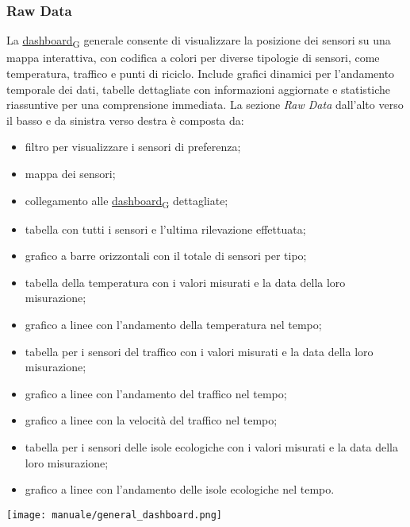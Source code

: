 \subsubsection{Raw Data}
La \href{https://7last.github.io/docs/pb/documentazione-interna/glossario\#dashboard}{dashboard\textsubscript{G}} generale consente di visualizzare la posizione dei sensori su una mappa interattiva, con codifica a colori per diverse tipologie di sensori, come temperatura, traffico e punti di riciclo. Include grafici dinamici per l'andamento temporale dei dati, tabelle dettagliate con informazioni aggiornate e statistiche riassuntive per una comprensione immediata. La sezione \textit{Raw Data} dall'alto verso il basso e da sinistra verso destra è composta da:
\begin{itemize}
    \item filtro per visualizzare i sensori di preferenza;
    \item mappa dei sensori;
    \item collegamento alle \href{https://7last.github.io/docs/pb/documentazione-interna/glossario\#dashboard}{dashboard\textsubscript{G}} dettagliate;
    \item tabella con tutti i sensori e l'ultima rilevazione effettuata;
    \item grafico a barre orizzontali con il totale di sensori per tipo;
    \item tabella della temperatura con i valori misurati e la data della loro misurazione;
    \item grafico a linee con l'andamento della temperatura nel tempo;
    \item tabella per i sensori del traffico con i valori misurati e la data della loro misurazione;
    \item grafico a linee con l'andamento del traffico nel tempo;
    \item grafico a linee con la velocità del traffico nel tempo;
    \item tabella per i sensori delle isole ecologiche con i valori misurati e la data della loro misurazione;
    \item grafico a linee con l'andamento delle isole ecologiche nel tempo.
\end{itemize}
\begin{center}
    \texttt{[image: manuale/general\_dashboard.png]}
\end{center}

